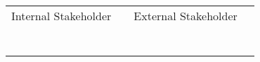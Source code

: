 \documentclass{standalone}
\begin{document}
\begin{tabular}{p{4cm} p{4cm} | p{4cm} p{4cm} }
\large Internal Stakeholder & & \large External Stakeholder & \\
& & & \\
& & & \\
& & & \\
& & & \\
& & & \\
& & & \\
& & & \\
\end{tabular}
\end{document}
